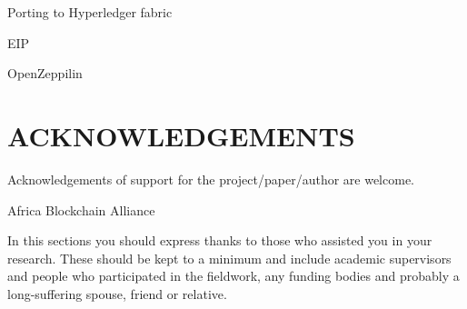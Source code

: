 \documentclass{isprs} %
\begin{document}
Porting to Hyperledger fabric 

EIP

OpenZeppilin


\section*{ACKNOWLEDGEMENTS}\label{ACKNOWLEDGEMENTS}
Acknowledgements of support for the project/paper/author are welcome. 

Africa Blockchain Alliance

In this sections you should express thanks to those who assisted you in your research. These should be kept
to a minimum and include academic supervisors and people who participated in the fieldwork, any funding
bodies and probably a long-suffering spouse, friend or relative.

{
	\begin{spacing}{1.17}
		\normalsize
	\end{spacing}
}
\end{document}
